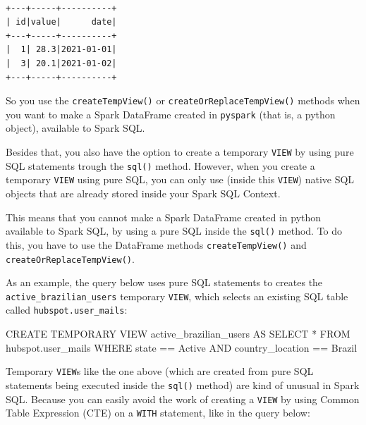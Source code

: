 \documentclass[
  11pt,
  letterpaper,
  DIV=11,
  numbers=noendperiod]{scrreprt}
\newenvironment{Shaded}{\begin{snugshade}}{\end{snugshade}}
\newcommand{\KeywordTok}[1]{\textcolor[rgb]{0.00,0.23,0.31}{#1}}
\newcommand{\NormalTok}[1]{\textcolor[rgb]{0.00,0.23,0.31}{#1}}
\newcommand{\OperatorTok}[1]{\textcolor[rgb]{0.37,0.37,0.37}{#1}}
\newcommand{\StringTok}[1]{\textcolor[rgb]{0.13,0.47,0.30}{#1}}
\begin{document}
\begin{verbatim}
                                                                                
\end{verbatim}

\begin{verbatim}
+---+-----+----------+
| id|value|      date|
+---+-----+----------+
|  1| 28.3|2021-01-01|
|  3| 20.1|2021-01-02|
+---+-----+----------+
\end{verbatim}

So you use the \texttt{createTempView()} or
\texttt{createOrReplaceTempView()} methods when you want to make a Spark
DataFrame created in \texttt{pyspark} (that is, a python object),
available to Spark SQL.

Besides that, you also have the option to create a temporary
\texttt{VIEW} by using pure SQL statements trough the \texttt{sql()}
method. However, when you create a temporary \texttt{VIEW} using pure
SQL, you can only use (inside this \texttt{VIEW}) native SQL objects
that are already stored inside your Spark SQL Context.

This means that you cannot make a Spark DataFrame created in python
available to Spark SQL, by using a pure SQL inside the \texttt{sql()}
method. To do this, you have to use the DataFrame methods
\texttt{createTempView()} and \texttt{createOrReplaceTempView()}.

As an example, the query below uses pure SQL statements to creates the
\texttt{active\_brazilian\_users} temporary \texttt{VIEW}, which selects
an existing SQL table called \texttt{hubspot.user\_mails}:

\begin{Shaded}
\begin{Highlighting}[]
\KeywordTok{CREATE} \KeywordTok{TEMPORARY} \KeywordTok{VIEW}\NormalTok{ active\_brazilian\_users }\KeywordTok{AS}
\KeywordTok{SELECT} \OperatorTok{*}
\KeywordTok{FROM}\NormalTok{ hubspot.user\_mails}
\KeywordTok{WHERE}\NormalTok{ state }\OperatorTok{==} \StringTok{\textquotesingle{}Active\textquotesingle{}}
\KeywordTok{AND}\NormalTok{ country\_location }\OperatorTok{==} \StringTok{\textquotesingle{}Brazil\textquotesingle{}}
\end{Highlighting}
\end{Shaded}

Temporary \texttt{VIEW}s like the one above (which are created from pure
SQL statements being executed inside the \texttt{sql()} method) are kind
of unusual in Spark SQL. Because you can easily avoid the work of
creating a \texttt{VIEW} by using Common Table Expression (CTE) on a
\texttt{WITH} statement, like in the query below:
\end{document}
